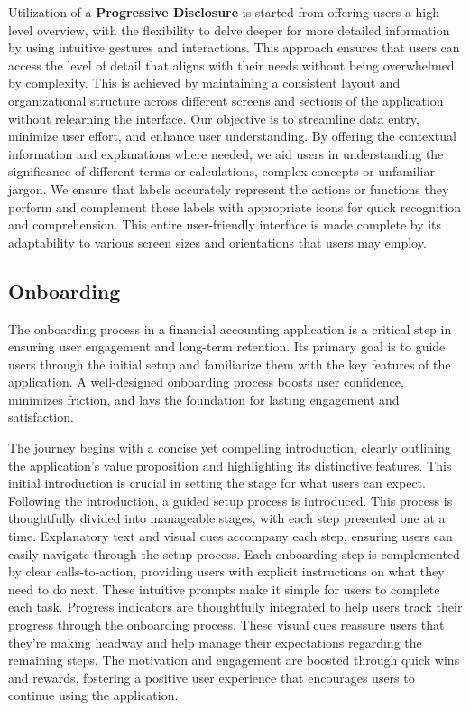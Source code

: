 Utilization of a \textbf{Progressive Disclosure} is started from offering users a high-level overview, with the 
flexibility to delve deeper for more detailed information by using intuitive gestures and interactions. This approach 
ensures that users can access the level of detail that aligns with their needs without being overwhelmed by complexity. 
This is achieved by maintaining a consistent layout and organizational structure across different screens and sections 
of the application without relearning the interface. Our objective is to streamline data entry, minimize user effort, 
and enhance user understanding. By offering the contextual information and explanations where needed, we aid users in 
understanding the significance of different terms or calculations, complex concepts or unfamiliar jargon. We ensure 
that labels accurately represent the actions or functions they perform and complement these labels with appropriate 
icons for quick recognition and comprehension. This entire user-friendly interface is made complete by its adaptability 
to various screen sizes and orientations that users may employ.


\subsection{Onboarding}

The onboarding process in a financial accounting application is a critical step in ensuring user engagement and 
long-term retention. Its primary goal is to guide users through the initial setup and familiarize them with the 
key features of the application. A well-designed onboarding process boosts user confidence, minimizes friction, and 
lays the foundation for lasting engagement and satisfaction.

The journey begins with a concise yet compelling introduction, clearly outlining the application's value proposition 
and highlighting its distinctive features. This initial introduction is crucial in setting the stage for what users 
can expect. Following the introduction, a guided setup process is introduced. This process is thoughtfully divided 
into manageable stages, with each step presented one at a time. Explanatory text and visual cues accompany each step, 
ensuring users can easily navigate through the setup process. Each onboarding step is complemented by clear 
calls-to-action, providing users with explicit instructions on what they need to do next. These intuitive prompts 
make it simple for users to complete each task. Progress indicators are thoughtfully integrated to help users track 
their progress through the onboarding process. These visual cues reassure users that they're making headway and help 
manage their expectations regarding the remaining steps. The motivation and engagement are boosted through quick wins 
and rewards, fostering a positive user experience that encourages users to continue using the application.

